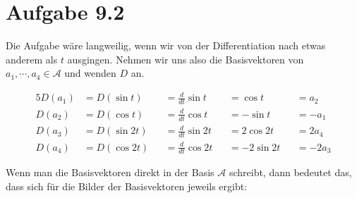 \documentclass[a4paper,german,12pt,smallheadings]{scrartcl}
\begin{document}
\section*{Aufgabe 9.2}
Die Aufgabe wäre langweilig, wenn wir von der Differentiation nach etwas
anderem als $t$ ausgingen. Nehmen wir uns also die Basisvektoren von
$a_1, \dotsb, a_4 \in \mathcal{A}$ und wenden $D$ an.

\begin{alignat*}{5}
  D(a_1) &= D(\sin t)  &&= \frac{d}{dt} \sin  t &&= \cos t    &&= a_2 \\
  D(a_2) &= D(\cos t)  &&= \frac{d}{dt} \cos  t &&= -\sin t   &&= -a_1 \\
  D(a_3) &= D(\sin 2t) &&= \frac{d}{dt} \sin 2t &&= 2\cos 2t  &&= 2a_4 \\
  D(a_4) &= D(\cos 2t) &&= \frac{d}{dt} \cos 2t &&= -2\sin 2t &&= -2a_3
\end{alignat*}

Wenn man die Basisvektoren direkt in der Basis $\mathcal{A}$ schreibt, dann
bedeutet das, dass sich für die Bilder der Basisvektoren jeweils ergibt:
\end{document}
